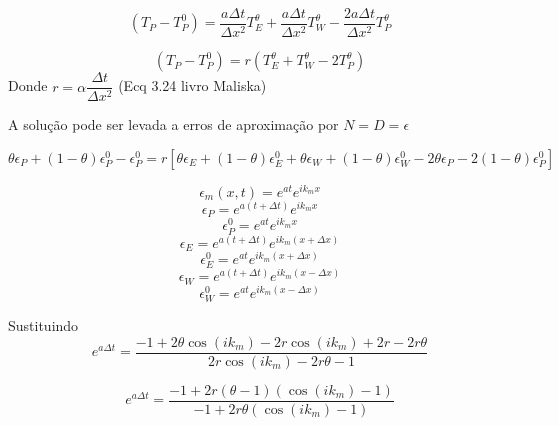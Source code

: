 \documentclass[]{article}
\begin{document}
\begin{equation}
	(T_P - T_P^0) = \frac{a \Delta t}{\Delta x^2} T_E^\theta + \frac{a \Delta t}{\Delta x^2} T_W^\theta - \frac{2a \Delta t}{\Delta x^2} T_P^\theta
\end{equation}

\begin{equation}
	(T_P - T_P^0) = r (T_E^\theta + T_W^\theta - 2T_P^\theta)
\end{equation}
Donde $r = \alpha\dfrac{\Delta t}{\Delta x^{2}}$ (Ecq 3.24 livro Maliska)

A solução pode ser levada a erros de aproximação por $N = D = \epsilon$

\begin{equation}
	\theta \epsilon_P + (1 - \theta) \epsilon_P^0 - \epsilon_P^0 =
	r \left[ \theta \epsilon_E + (1 - \theta) \epsilon_E^0 + \theta \epsilon_W + (1 - \theta) \epsilon_W^0 - 2 \theta \epsilon_P - 2 (1 - \theta) \epsilon_P^0 \right]
\end{equation}


\begin{equation}
	\epsilon_m(x, t) = e^{a t} e^{i k_m x}
\end{equation}
\begin{equation}
	\epsilon_P = e^{a (t + \Delta t)} e^{i k_m x}
\end{equation}
\begin{equation}
	\epsilon_P^0 = e^{a t} e^{i k_m x}
\end{equation}
\begin{equation}
	\epsilon_E = e^{a (t + \Delta t)} e^{i k_m (x + \Delta x)}
\end{equation}
\begin{equation}
	\epsilon_E^0 = e^{a t} e^{i k_m (x + \Delta x)}
\end{equation}
\begin{equation}
	\epsilon_W = e^{a (t + \Delta t)} e^{i k_m (x - \Delta x)}
\end{equation}
\begin{equation}
	\epsilon_W^0 = e^{a t} e^{i k_m (x - \Delta x)}
\end{equation}

Sustituindo
\begin{equation}
	e^{a \Delta t} = \frac{-1 + 2\theta \cos(i k_m) - 2r \cos(i k_m) + 2r - 2r \theta}{2r \cos(i k_m) - 2r \theta - 1}
\end{equation}

\begin{equation}
	e^{a \Delta t} = \frac{-1 + 2r (\theta - 1) (\cos(i k_m) - 1)}{-1 + 2r \theta (\cos(i k_m) - 1)}
\end{equation}
\end{document}
